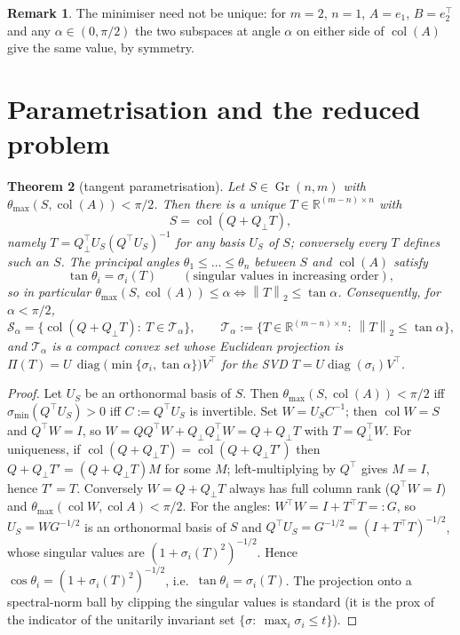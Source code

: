 \documentclass[11pt]{article}
\newtheorem{theorem}{Theorem}[section]
\theoremstyle{definition}
\newtheorem{remark}[theorem]{Remark}
\newcommand{\R}{\mathbb{R}}
\newcommand{\col}{\operatorname{col}}
\newcommand{\Gr}{\operatorname{Gr}}
\newcommand{\norm}[1]{\left\lVert #1 \right\rVert}
\newcommand{\Qp}{Q_{\perp}}
\newcommand{\Pop}{\Pi}
\newcommand{\Tf}{\mathcal{T}}
\newcommand{\Sf}{\mathcal{S}}
\DeclareMathOperator{\diag}{diag}
\begin{document}
\begin{remark}
The minimiser need not be unique: for $m=2$, $n=1$, $A=e_1$, $B=e_2^\top$ and any $\alpha\in(0,\pi/2)$ the two subspaces at angle $\alpha$ on either side of $\col(A)$ give the same value, by symmetry.
\end{remark}

\section{Parametrisation and the reduced problem}

\begin{theorem}[tangent parametrisation]\label{thm:param}
Let $S\in\Gr(n,m)$ with $\theta_{\max}(S,\col(A))<\pi/2$. Then there is a unique $T\in\R^{(m-n)\times n}$ with
\begin{equation}
  S=\col(Q+\Qp T),
\end{equation}
namely $T=\Qp^\top U_S(Q^\top U_S)^{-1}$ for any basis $U_S$ of $S$; conversely every $T$ defines such an $S$.
The principal angles $\theta_1\le\dots\le\theta_n$ between $S$ and $\col(A)$ satisfy
\begin{equation}
  \tan\theta_i=\sigma_i(T)\qquad(\text{singular values in increasing order}),
\end{equation}
so in particular $\theta_{\max}(S,\col(A))\le\alpha \iff \norm T_2\le\tan\alpha$.
Consequently, for $\alpha<\pi/2$,
\begin{equation}
 \Sf_\alpha=\bigl\{\col(Q+\Qp T):\ T\in\Tf_\alpha\bigr\},\qquad
 \Tf_\alpha:=\{T\in\R^{(m-n)\times n}:\ \norm T_2\le\tan\alpha\},
\end{equation}
and $\Tf_\alpha$ is a compact convex set whose Euclidean projection is
$\Pop(T)=U\,\diag\big(\min\{\sigma_i,\tan\alpha\}\big)V^\top$ for the SVD $T=U\diag(\sigma_i)V^\top$.
\end{theorem}
\begin{proof}
Let $U_S$ be an orthonormal basis of $S$. Then $\theta_{\max}(S,\col(A))<\pi/2$ iff $\sigma_{\min}(Q^\top U_S)>0$ iff $C:=Q^\top U_S$ is invertible.
Set $W=U_S C^{-1}$; then $\col W=S$ and $Q^\top W=I$, so $W=QQ^\top W+\Qp\Qp^\top W=Q+\Qp T$ with $T=\Qp^\top W$.
For uniqueness, if $\col(Q+\Qp T)=\col(Q+\Qp T')$ then $Q+\Qp T'=(Q+\Qp T)M$ for some $M$; left-multiplying by $Q^\top$ gives $M=I$, hence $T'=T$.
Conversely $W=Q+\Qp T$ always has full column rank ($Q^\top W=I$) and $\theta_{\max}(\col W,\col A)<\pi/2$.
For the angles: $W^\top W=I+T^\top T=:G$, so $U_S=WG^{-1/2}$ is an orthonormal basis of $S$ and $Q^\top U_S=G^{-1/2}=(I+T^\top T)^{-1/2}$, whose singular values are $(1+\sigma_i(T)^2)^{-1/2}$. Hence $\cos\theta_i=(1+\sigma_i(T)^2)^{-1/2}$, i.e.\ $\tan\theta_i=\sigma_i(T)$.
The projection onto a spectral-norm ball by clipping the singular values is standard (it is the prox of the indicator of the unitarily invariant set $\{\sigma:\ \max_i\sigma_i\le t\}$).
\end{proof}
\end{document}
